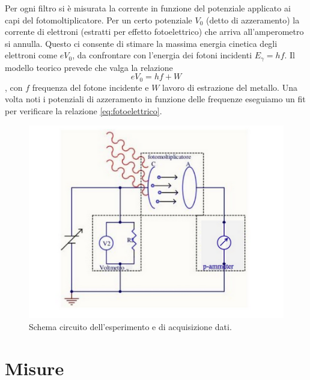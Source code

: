 \documentclass[10pt,a4paper]{article}
\begin{document}
Per ogni filtro si è misurata la corrente in funzione del potenziale applicato ai capi del fotomoltiplicatore. Per un certo potenziale $V_0$ (detto di azzeramento) la corrente di elettroni (estratti per effetto fotoelettrico) che arriva all'amperometro si annulla. Questo ci consente di stimare la massima energia cinetica degli elettroni come $eV_0$, da confrontare con l'energia dei fotoni incidenti $E_{\gamma}=hf$. 
 Il modello teorico prevede che valga la relazione
 \begin{equation}\label{eq:fotoelettrico}
 eV_0 = hf + W
 \end{equation}, con $f$ frequenza del fotone incidente e $W$ lavoro di estrazione del metallo. Una volta noti i potenziali di azzeramento in funzione delle frequenze eseguiamo un fit per verificare la relazione \ref{eq:fotoelettrico}.
\begin{figure}[!htb]
  \centering
  \includegraphics[scale=1.0]{circuito.png}
\caption{Schema circuito dell'esperimento e di acquisizione dati.\label{circuito}}
\end{figure}


\section{Misure}
\end{document}
